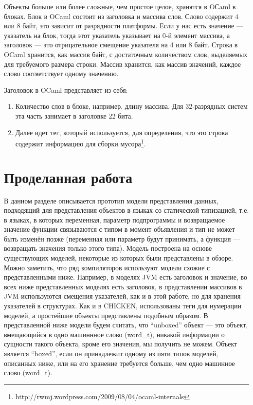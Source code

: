 Объекты больше или более сложные, чем простое целое, хранятся в OСaml в блоках.
Блок в OCaml состоит из заголовка и массива слов. Слово содержит 4 или 8 байт, это зависит от разрядности платформы.
Если у нас есть значение — указатель на блок,
тогда этот указатель указывает на 0-й элемент массива, а
заголовок --- это отрицательное смещение указателя на 4 или 8 байт.
Строка в OCaml хранится, как массив байт,
с достаточным количеством слов, выделяемых для требуемого размера строки.
Массив хранится, как массив значений,
каждое слово соответствует одному значению.

Заголовок в OCaml представляет из себя:
\begin{enumerate}
\item[1)] Количество слов в блоке, например, длину массива. Для 32-разрядных систем эта часть занимает в заголовке 22 бита.
\item[2)] Далее идет тег, который используется, для определения, что это строка содержит информацию для сборки мусора\footnote{http://rwmj.wordpress.com/2009/08/04/ocaml-internals}.
\end{enumerate}



\newpage
\section {Проделанная работа}

В данном разделе описывается прототип модели представления данных,
подходящий для представления объектов в языках со статической типизацией, 
т.е. в языках, в которых переменная, параметр подпрограммы и
возвращаемое значение функции связываются с типом 
в момент объявления и тип не может быть изменён позже
(переменная или параметр будут принимать, а функция 
— возвращать значения только этого типа).
Модель построена на основе существующих моделей,
некоторые из которых были представлены в обзоре.
Можно заметить, что ряд компиляторов используют модели схожие с 
представленными ниже. 
Например, в моделях JVM
есть заголовок и значение, во всех ниже представленных моделях есть заголовок,
в представлении массивов в JVM используются смещения указателей,
как и в этой работе,
но для хранения указателей в структурах. 
Как и в CHIСKEN, использованы теги для нумерации моделей,
а простейшие объекты представлены подобным образом.
В представленной ниже модели будем считать, что ``unboxed''  объект — это объект,
вмещающийся в одно машиннное слово (word\_t), 
никакой информации о сущности такого объекта, кроме его значения, мы получить не можем.
Объект является ``boxed'', если он принадлежит одному из пяти
типов моделей, описанных ниже, или на его хранение требуется больше,
чем одно машинное слово (word\_t).

